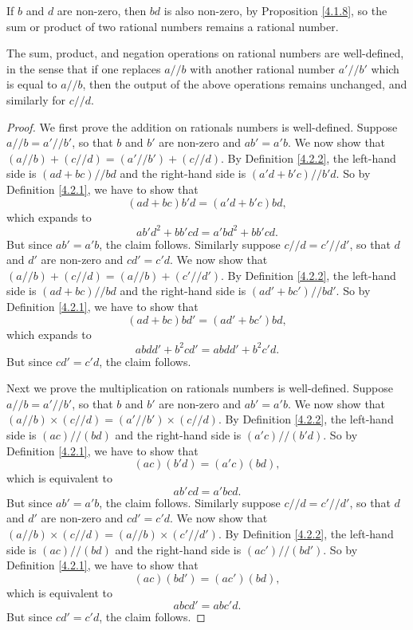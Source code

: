 \begin{note}
    If \(b\) and \(d\) are non-zero, then \(bd\) is also non-zero, by Proposition \ref{4.1.8}, so the sum or product of two rational numbers remains a rational number.
\end{note}

\begin{lemma}\label{4.2.3}
    The sum, product, and negation operations on rational numbers are well-defined, in the sense that if one replaces \(a // b\) with another rational number \(a' // b'\) which is equal to \(a // b\), then the output of the above operations remains unchanged, and similarly for \(c // d\).
\end{lemma}

\begin{proof}
    We first prove the addition on rationals numbers is well-defined.
    Suppose \(a // b = a' // b'\), so that \(b\) and \(b'\) are non-zero and \(ab' = a'b\).
    We now show that \((a // b) + (c // d) = (a' // b') + (c // d)\).
    By Definition \ref{4.2.2}, the left-hand side is \((ad + bc) // bd\) and the right-hand side is \((a'd + b'c) // b'd\).
    So by Definition \ref{4.2.1}, we have to show that
    \[
        (ad + bc)b'd = (a'd + b'c)bd,
    \]
    which expands to
    \[
        ab'd^2 + bb'cd = a'bd^2 + bb'cd.
    \]
    But since \(ab' = a'b\), the claim follows.
    Similarly suppose \(c // d = c' // d'\), so that \(d\) and \(d'\) are non-zero and \(cd' = c'd\).
    We now show that \((a // b) + (c // d) = (a // b) + (c' // d')\).
    By Definition \ref{4.2.2}, the left-hand side is \((ad + bc) // bd\) and the right-hand side is \((ad' + bc') // bd'\).
    So by Definition \ref{4.2.1}, we have to show that
    \[
        (ad + bc)bd' = (ad' + bc')bd,
    \]
    which expands to
    \[
        abdd' + b^2cd' = abdd' + b^2c'd.
    \]
    But since \(cd' = c'd\), the claim follows.

    Next we prove the multiplication on rationals numbers is well-defined.
    Suppose \(a // b = a' // b'\), so that \(b\) and \(b'\) are non-zero and \(ab' = a'b\).
    We now show that \((a // b) \times (c // d) = (a' // b') \times (c // d)\).
    By Definition \ref{4.2.2}, the left-hand side is \((ac) // (bd)\) and the right-hand side is \((a'c) // (b'd)\).
    So by Definition \ref{4.2.1}, we have to show that
    \[
        (ac)(b'd) = (a'c)(bd),
    \]
    which is equivalent to
    \[
        ab'cd = a'bcd.
    \]
    But since \(ab' = a'b\), the claim follows.
    Similarly suppose \(c // d = c' // d'\), so that \(d\) and \(d'\) are non-zero and \(cd' = c'd\).
    We now show that \((a // b) \times (c // d) = (a // b) \times (c' // d')\).
    By Definition \ref{4.2.2}, the left-hand side is \((ac) // (bd)\) and the right-hand side is \((ac') // (bd')\).
    So by Definition \ref{4.2.1}, we have to show that
    \[
        (ac)(bd') = (ac')(bd),
    \]
    which is equivalent to
    \[
        abcd' = abc'd.
    \]
    But since \(cd' = c'd\), the claim follows.


\end{proof}

